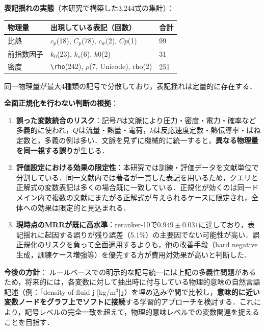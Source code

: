\documentclass[11pt,a4paper]{ltjsarticle}
\begin{document}
\textbf{表記揺れの実態}（本研究で構築した3,244式の集計）：

\begin{table}[h]
\centering
\small
\begin{tabular}{lll}
\toprule
物理量 & 出現している表記（回数） & 合計 \\
\midrule
比熱 & $c_p$(18), $C_p$(78), $c_w$(2), $Cp$(1) & 99 \\
前指数因子 & $k_0$(23), $k_o$(6), $k0$(2) & 31 \\
密度 & \verb|\rho|(242), $\rho$(7, Unicode), rho(2) & 251 \\
\bottomrule
\end{tabular}
\end{table}

\noindent 同一物理量が最大4種類の記号で分散しており，表記揺れは定量的に存在する．

\textbf{全面正規化を行わない判断の根拠}：

\begin{enumerate}[leftmargin=2em, nosep]
  \item \textbf{誤った変数統合のリスク}：記号$P$は文脈により圧力・密度・電力・確率など多義的に使われ，$Q$は流量・熱量・電荷，$k$は反応速度定数・熱伝導率・ばね定数と，多義の例は多い．文脈を見ずに機械的に統一すると，\textbf{異なる物理量を同一視する誤り}が生じる．
  \item \textbf{評価設定における効果の限定性}：本研究では訓練・評価データを文献単位で分割している．同一文献内では著者が一貫した表記を用いるため，クエリと正解式の変数表記は多くの場合既に一致している．正規化が効くのは同一ドメイン内で複数の文献にまたがる正解式が与えられるケースに限定され，全体への効果は限定的と見込まれる．
  \item \textbf{現時点のMRRが既に高水準}：reranker-10で$0.949\pm0.031$に達しており，表記揺れに起因する誤りが残り誤差（5.1\%）の主要因でない可能性が高い．誤正規化のリスクを負って全面適用するよりも，他の改善手段（hard negative生成，訓練ケース増強等）を優先する方が費用対効果が高いと判断した．
\end{enumerate}

\textbf{今後の方針}：
ルールベースでの明示的な記号統一には上記の多義性問題があるため，将来的には，各変数に対して抽出時に付与している物理的意味の自然言語記述（例：「density of fluid j [kg/m$^3$]」）を埋め込み空間で比較し，\textbf{意味的に近い変数ノードをグラフ上でソフトに接続}する学習的アプローチを検討する．これにより，記号レベルの完全一致を超えて，物理的意味レベルでの変数関連を捉えることを目指す．
\end{document}

